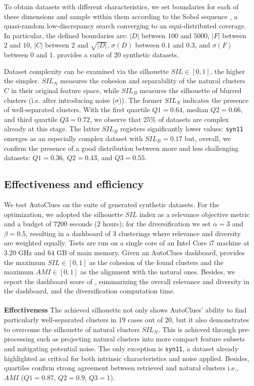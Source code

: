\documentclass[runningheads]{llncs}
\begin{document}
To obtain datasets with different characteristics, we set boundaries for each of these dimensions and sample within them according to the Sobol sequence \cite{sobol1967distribution}, a quasi-random low-discrepancy search converging to an equi-distributed coverage. 
In particular, the defined boundaries are: $|D|$ between $100$ and $5000$, $|F|$ between $2$ and $10$, $|C|$ between $2$ and $\sqrt{|D|}$, $\sigma(D)$ between $0.1$ and $0.3$, and $\sigma(F)$ between $0$ and $1$.
 provides a suite of $20$ synthetic datasets. 

Dataset complexity can be examined via the silhouette $SIL \in [0, 1]$, the higher the simpler. 
$SIL_N$ measures the cohesion and separability of the natural clusters $C$ in their original feature space, while  $SIL_B$ measures the silhouette of blurred clusters (i.e. after introducing noise ($\sigma$)).
The former $SIL_N$ indicates the presence of well-separated clusters.
With the first quartile $Q1=0.64$, median $Q2=0.66$, and third quartile $Q3=0.72$, we observe that 25\% of datasets are complex already at this stage. 
The latter $SIL_B$ registers significantly lower values: \texttt{syn11} emerges as an especially complex dataset with $SIL_B=0.17$ but, overall, we confirm the presence of a good distribution between more and less challenging datasets: $Q1 = 0.36$, $Q2 = 0.43$, and $Q3 = 0.55$.

\subsection{Effectiveness and efficiency}
\label{ssec:effectiveness}


We test AutoClues on the suite of generated synthetic datasets.
For the optimization, we adopted the silhouette $SIL$ index as a relevance objective metric and a budget of $7200$ seconds ($2$ hours); for the diversification we set $\alpha=3$ and $\beta=0.5$, resulting in a dashboard of $3$ clusterings where relevance and diversity are weighted equally.
Tests are run on a single core of an Intel Core i7 machine at $3.20$ GHz and $64$ GB of main memory.
%
Given an AutoClues dashboard,  provides
the maximum $SIL\in [0, 1]$ as the cohesion of the found clusters and the maximum $AMI \in [0, 1]$ as the alignment with the natural ones. Besides, we report the dashboard score of , summarizing the overall relevance and diversity in the dashboard, and the diversification computation time.
\\
\\
\textbf{Effectiveness}
The achieved silhouette not only shows AutoClues' ability to find particularly well-separated clusters in 19 cases out of 20, but it also demonstrates to overcome the silhouette of natural clusters $SIL_N$. 
This is achieved through pre-processing such as projecting natural clusters into more compact feature subsets and mitigating potential noise.
The only exception is \texttt{syn11}, a dataset already highlighted as critical for both intrinsic characteristics and noise applied. 
Besides, quartiles confirm strong agreement between retrieved and natural clusters i.e., $AMI$ ($Q1=0.87$, $Q2=0.9$, $Q3=1$). 
\end{document}

